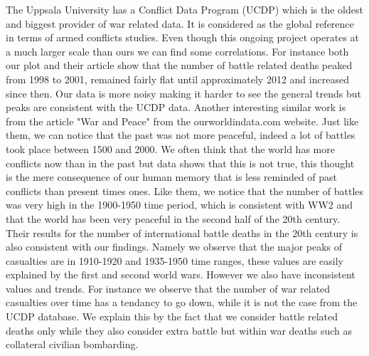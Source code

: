 The Uppsala University has a Conflict Data Program (UCDP) which is the oldest and biggest provider of war related data. It is considered as the global reference in terms of armed conflicts studies. Even though this ongoing project operates at a much larger scale than ours we can find some correlations. For instance both our plot and their article show that the number of battle related deaths peaked from 1998 to 2001, remained fairly flat until approximately 2012 and increased since then. Our data is more noisy making it harder to see the general trends but peaks are consistent with the UCDP data.
Another interesting similar work is from the article "War and Peace" from the ourworldindata.com website. Just like them, we can notice that the past was not more peaceful, indeed a lot of battles took place between 1500 and 2000. We often think that the world has more conflicts now than in the past but data shows that this is not true, this thought is the mere consequence of our human memory that is less reminded of past conflicts than present times ones. Like them, we notice that the number of battles was very high in the 1900-1950 time period, which is consistent with WW2 and that the world has been very peaceful in the second half of the 20th century. Their results for the number of international battle deaths in the 20th century is also consistent with our findings. Namely we observe that the major peaks of casualties are in 1910-1920 and 1935-1950 time ranges, these values are easily explained by the first and second world wars.
However we also have inconsistent values and trends. For instance we observe that the number of war related casualties over time has a tendancy to go down, while it is not the case from the UCDP database. We explain this by the fact that we consider battle related deaths only while they also consider extra battle but within war deaths such as collateral civilian bombarding.


